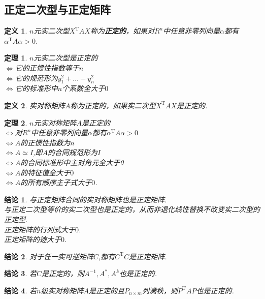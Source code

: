 \documentclass[UTF8]{article}
\newtheorem{thrm}{定理}[subsection]
\newtheorem{defn}{定义}[subsection]
\newtheorem{ccl}{结论}[subsection]
\begin{document}
\subsection{正定二次型与正定矩阵}
\begin{defn}
  $n$元实二次型$X^{\mathrm{T}}AX$称为\textbf{正定的}，如果对$R^n$中任意非零列向量$\alpha$都有$\alpha^{\mathrm{T}}A\alpha>0$.
\end{defn}
\begin{thrm}
  $n$元实二次型是正定的\\
  $\Longleftrightarrow$它的正惯性指数等于$n$\\
  $\Longleftrightarrow$它的规范形为$y_1^2+\ldots+y_n^2$\\
  $\Longleftrightarrow$它的标准形中$n$个系数全大于$0$
\end{thrm}
\begin{defn}
  实对称矩阵$A$称为正定的，如果实二次型$X^{\mathrm{T}}AX$是正定的.
\end{defn}
\begin{thrm}
  $n$元实对称矩阵$A$是正定的\\
  $\Longleftrightarrow$对$R^n$中任意非零列向量$\alpha$都有$\alpha^{\mathrm{T}}A\alpha>0$\\
  $\Longleftrightarrow$$A$的正惯性指数为$n$\\
  $\Longleftrightarrow$$A\simeq I$,即$A$的合同规范形为$I$\\
  $\Longleftrightarrow$$A$的合同标准形中主对角元全大于0\\
  $\Longleftrightarrow$$A$的特征值全大于$0$\\
  $\Longleftrightarrow$$A$的所有顺序主子式大于$0$.
\end{thrm}
\begin{ccl}
  与正定矩阵合同的实对称矩阵也是正定矩阵.\\
  与正定二次型等价的实二次型也是正定的，从而非退化线性替换不改变实二次型的正定型.\\
  正定矩阵的行列式大于$0$.\\
  正定矩阵的迹大于$0$.
\end{ccl}
\begin{ccl}
  对于任一实可逆矩阵$C$,都有$C^{\mathrm{T}}C$是正定矩阵.
\end{ccl}
\begin{ccl}
  若$C$是正定的，则$A^{-1},A^{*},A^k$也是正定的.
\end{ccl}
\begin{ccl}
  若$n$级实对称矩阵$A$是正定的且$P_{n\times m}$列满秩，则$P^{\mathrm{T}}AP$也是正定的.
\end{ccl}
\end{document}

